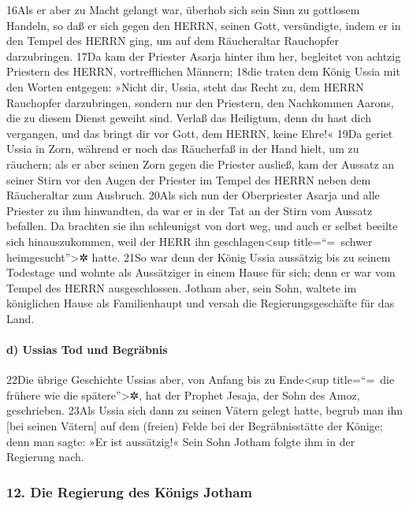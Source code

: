 16Als er aber zu Macht gelangt war, überhob sich sein Sinn zu gottlosem
Handeln, so daß er sich gegen den HERRN, seinen Gott, versündigte, indem
er in den Tempel des HERRN ging, um auf dem Räucheraltar Rauchopfer
darzubringen. 17Da kam der Priester Asarja hinter ihm her, begleitet von
achtzig Priestern des HERRN, vortrefflichen Männern; 18die traten dem
König Ussia mit den Worten entgegen: »Nicht dir, Ussia, steht das Recht
zu, dem HERRN Rauchopfer darzubringen, sondern nur den Priestern, den
Nachkommen Aarons, die zu diesem Dienst geweiht sind. Verlaß das
Heiligtum, denn du hast dich vergangen, und das bringt dir vor Gott, dem
HERRN, keine Ehre!« 19Da geriet Ussia in Zorn, während er noch das
Räucherfaß in der Hand hielt, um zu räuchern; als er aber seinen Zorn
gegen die Priester ausließ, kam der Aussatz an seiner Stirn vor den
Augen der Priester im Tempel des HERRN neben dem Räucheraltar zum
Ausbruch. 20Als sich nun der Oberpriester Asarja und alle Priester zu
ihm hinwandten, da war er in der Tat an der Stirn vom Aussatz befallen.
Da brachten sie ihn schleunigst von dort weg, und auch er selbst beeilte
sich hinauszukommen, weil der HERR ihn geschlagen\textless sup
title=``=~schwer heimgesucht''\textgreater✲ hatte. 21So war denn der
König Ussia aussätzig bis zu seinem Todestage und wohnte als Aussätziger
in einem Hause für sich; denn er war vom Tempel des HERRN
ausgeschlossen. Jotham aber, sein Sohn, waltete im königlichen Hause als
Familienhaupt und versah die Regierungsgeschäfte für das Land.

\hypertarget{d-ussias-tod-und-begruxe4bnis}{%
\paragraph{d) Ussias Tod und
Begräbnis}\label{d-ussias-tod-und-begruxe4bnis}}

22Die übrige Geschichte Ussias aber, von Anfang bis zu Ende\textless sup
title=``=~die frühere wie die spätere''\textgreater✲, hat der Prophet
Jesaja, der Sohn des Amoz, geschrieben. 23Als Ussia sich dann zu seinen
Vätern gelegt hatte, begrub man ihn {[}bei seinen Vätern{]} auf dem
(freien) Felde bei der Begräbnisstätte der Könige; denn man sagte: »Er
ist aussätzig!« Sein Sohn Jotham folgte ihm in der Regierung nach.

\hypertarget{die-regierung-des-kuxf6nigs-jotham}{%
\subsubsection{12. Die Regierung des Königs
Jotham}\label{die-regierung-des-kuxf6nigs-jotham}}

